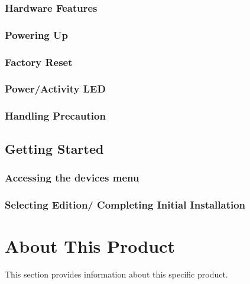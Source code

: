 \documentclass[letterpaper,10pt,english]{sphinxmanual}
\begin{document}
\subsection{Hardware Features}
\label{\detokenize{introduction:hardware-features}}

\subsection{Powering Up}
\label{\detokenize{introduction:powering-up}}

\subsection{Factory Reset}
\label{\detokenize{introduction:factory-reset}}

\subsection{Power/Activity LED}
\label{\detokenize{introduction:power-activity-led}}

\subsection{Handling Precaution}
\label{\detokenize{introduction:handling-precaution}}



\section{Getting Started}
\label{\detokenize{introduction:getting-started}}

\subsection{Accessing the devices menu}
\label{\detokenize{introduction:accessing-the-devices-menu}}

\subsection{Selecting Edition/ Completing Initial Installation}
\label{\detokenize{introduction:selecting-edition-completing-initial-installation}}

\chapter{About This Product}
\label{\detokenize{thisproduct:about-this-product}}\label{\detokenize{thisproduct::doc}}
This section provides information about this specific product.
\end{document}
